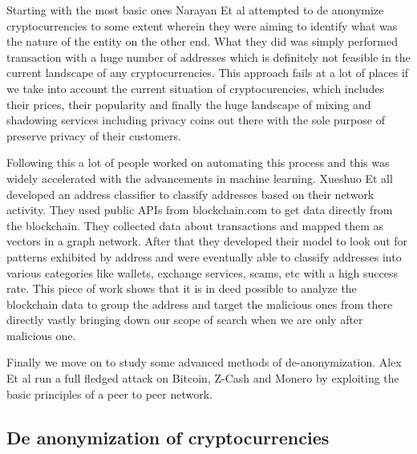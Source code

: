 \documentclass{article}
\begin{document}
        Starting with the most basic ones Narayan Et al\cite{narayanan2016bitcoin} attempted to de anonymize cryptocurrencies to some extent wherein they were aiming to identify what was the nature of the entity on the other end. What they did was simply performed transaction with a huge number of addresses which is definitely not feasible in the current landscape of any cryptocurrencies. This approach fails at a lot of places if we take into account the current situation of cryptocurencies, which includes their prices, their popularity and finally the huge landscape of mixing and shadowing services including privacy coins out there with the sole purpose of preserve privacy of their customers. 
        
        Following this a lot of people worked on automating this process and this was widely accelerated with the advancements in machine learning. Xueshuo Et all\cite{xueshuo2021awap} developed an address classifier to classify addresses based on their network activity. They used public APIs from blockchain.com\cite{blockchain.com} to get data directly from the blockchain. They collected data about transactions and mapped them as vectors in a graph network. After that they developed their model to look out for patterns exhibited by address and were eventually able to classify addresses into various categories like wallets, exchange services, scams, etc with a high success rate. This piece of work shows that it is in deed possible to analyze the blockchain data to group the address and target the malicious ones from there directly vastly bringing down our scope of search when we are only after malicious one. 
        
        Finally we move on to study some advanced methods of de-anonymization. Alex Et al\cite{biryukov2019deanonymization} run a full fledged attack on Bitcoin, Z-Cash and Monero by exploiting the basic principles of a peer to peer network. 
        

\pagebreak

    \subsection{De anonymization of cryptocurrencies}
        
\end{document}
